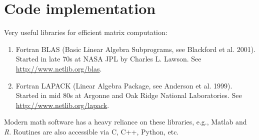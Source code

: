 %
%
%

\section{Code implementation}
\begin{frame}
Very useful libraries for efficient matrix computation:
\begin{enumerate}\setlength{\itemsep}{0.3cm}
\item Fortran BLAS (Basic Linear Algebra Subprograms, see Blackford et al. 2001). Started in late 70s at NASA JPL by Charles L. Lawson. See \url{http://www.netlib.org/blas}.
\item Fortran LAPACK (Linear Algebra Package, see Anderson et al. 1999). Started in mid 80s at Argonne and Oak Ridge National Laboratories. See \url{http://www.netlib.org/lapack}.
\end{enumerate}

\vspace{0.5cm}

Modern math software has a heavy reliance on these libraries, e.g., Matlab and \emph{R}. Routines are also accessible via C, C++, Python, etc.
\end{frame}

